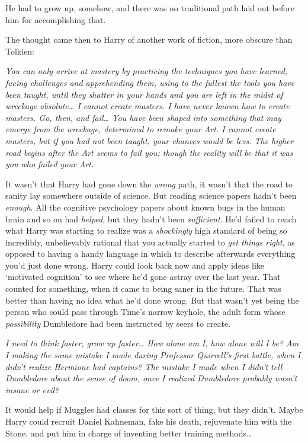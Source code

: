 He had to grow up, somehow, and there was no traditional path laid out before him for accomplishing that.

The thought came then to Harry of another work of fiction, more obscure than Tolkien:

\emph{You can only arrive at mastery by practicing the techniques you have learned, facing challenges and apprehending them, using to the fullest the tools you have been taught, until they shatter in your hands and you are left in the midst of wreckage absolute{\ldots} I cannot create masters. I have never known how to create masters. Go, then, and fail{\ldots} You have been shaped into something that may emerge from the wreckage, determined to remake your Art. I cannot create masters, but if you had not been taught, your chances would be less. The higher road begins after the Art seems to fail you; though the reality will be that it was you who failed your Art.}

It wasn't that Harry had gone down the \emph{wrong} path, it wasn't that the road to sanity lay somewhere outside of science. But reading science papers hadn't been \emph{enough}. All the cognitive psychology papers about known bugs in the human brain and so on had \emph{helped}, but they hadn't been \emph{sufficient}. He'd failed to reach what Harry was starting to realize was a \emph{shockingly} high standard of being so incredibly, unbelievably rational that you actually started to \emph{get things right}, as opposed to having a handy language in which to describe afterwards everything you'd just done wrong. Harry could look back now and apply ideas like `motivated cognition' to see where he'd gone astray over the last year. That counted for something, when it came to being saner in the future. That was better than having no idea what he'd done wrong. But that wasn't yet being the person who could pass through Time's narrow keyhole, the adult form whose \emph{possibility} Dumbledore had been instructed by seers to create.

\emph{I need to think faster, grow up faster{\ldots} How alone am I, how alone will I be? Am I making the same mistake I made during Professor Quirrell's first battle, when I didn't realize Hermione had captains? The mistake I made when I didn't tell Dumbledore about the sense of doom, once I realized Dumbledore probably wasn't insane or evil?}

It would help if Muggles had classes for this sort of thing, but they didn't. Maybe Harry could recruit Daniel Kahneman, fake his death, rejuvenate him with the Stone, and put him in charge of inventing better training methods{\ldots}

